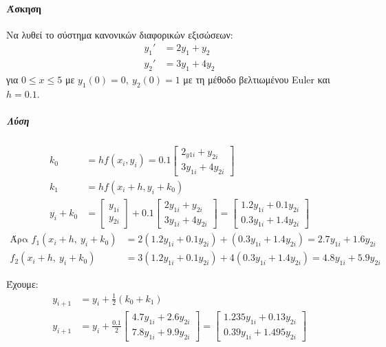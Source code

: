 \documentclass[11pt,a4paper,notitlepage,fleqn,final]{article}
\begin{document}
\paragraph{Άσκηση}
Να λυθεί το σύστημα κανονικών διαφορικών εξισώσεων:
\begin{align*}
	y_1' &= 2y_1 + y_2 \\
	y_2' &= 3y_1 + 4y_2
\end{align*} για \( 0 \leq x \leq 5 \) με \( y_1(0)=0,\ y_2(0)=1 \)
με τη μέθοδο βελτιωμένου Euler και \( h=0.1 \).
\subparagraph{Λύση}
\begin{align*}
	k_0 &= hf(x_i,y_i) = 0.1\left[\begin{matrix}
	2_{y1i}+y_{2i} \\
	3y_{1i}+4y_{2i}
	\end{matrix}\right] \\
	k_1 &= hf(x_i+h,y_i+k_0) \\
	y_i + k_0 &= \left[\begin{matrix}
	y_{1i}\\ y_{2i}
	\end{matrix}\right] + 0.1\left[\begin{matrix}
	2y_{1i} + y_{2i}\\
	3y_{1i}+4y_{2i}
	\end{matrix}\right] = \left[\begin{matrix}
	1.2y_{1i} + 0.1y_{2i}\\
	0.3y_{1i} + 1.4y_{2i}
	\end{matrix}\right]
\end{align*}
\begin{align*}
	\text{Άρα } f_1(x_i+h,\ y_i+k_0) &=
	2(1.2y_{1i}+0.1y_{2i}) + (0.3y_{1i}+1.4y_{2i}) =
	2.7y_{1i} + 1.6y_{2i} \\
	f_2(x_i+h,\ y_i+k_0) &=
	3(1.2y_{1i}+0.1y_{2i}) + 4(0.3y_{1i}+1.4y_{2i}) =
	4.8y_{1i}+5.9y_{2i}
\end{align*}

Έχουμε:
\begin{align*}
	y_{i+1} &= y_i + \frac{1}{2}(k_0+k_1)
	\\ y_{i+1} &= y_i + \frac{0.1}{2} \left[
	\begin{matrix}
	4.7y_{1i} + 2.6y_{2i} \\
	7.8y_{1i}+9.9y_{2i}
	\end{matrix}
	\right] = \left[\begin{matrix}
	1.235y_{1i} + 0.13y_{2i} \\
	0.39y_{1i} + 1.495y_{2i}
	\end{matrix}\right]
\end{align*}
\end{document}
